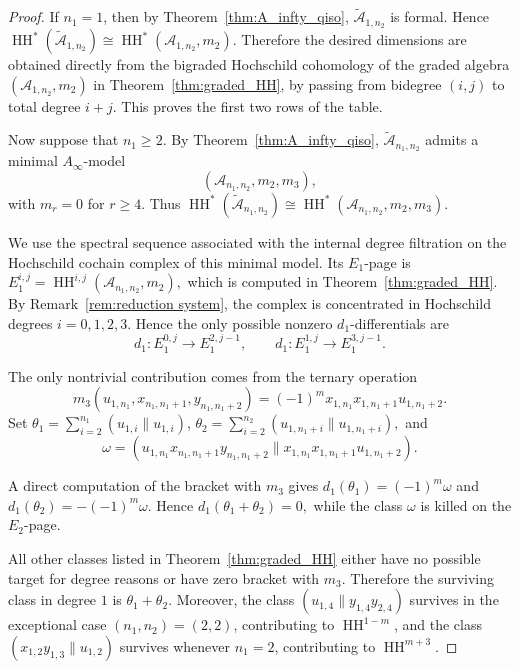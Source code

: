\documentclass[a4paper, reqno, 11pt]{amsart}
\theoremstyle{definition}
\begin{document}
\begin{proof}
	If \(n_1=1\), then by Theorem~\ref{thm:A_infty_qiso},
	\(\widetilde{\mathcal A}_{1,n_2}\) is formal. Hence
	\(
	\operatorname{HH}^\ast(\widetilde{\mathcal A}_{1,n_2})
	\cong
	\operatorname{HH}^\ast(\mathcal A_{1,n_2},m_2).
	\)
	Therefore the desired dimensions are obtained directly from the bigraded
	Hochschild cohomology of the graded algebra \((\mathcal A_{1,n_2},m_2)\) in
	Theorem~\ref{thm:graded_HH}, by passing from bidegree \((i,j)\) to total degree
	\(i+j\). This proves the first two rows of the table.
	
	Now suppose that \(n_1\ge 2\). By Theorem~\ref{thm:A_infty_qiso},
	\(\widetilde{\mathcal A}_{n_1,n_2}\) admits a minimal \(A_\infty\)-model \[(\mathcal A_{n_1,n_2},m_2,m_3),\] with \(
	m_r=0 \) for \(r\ge 4.\)
	Thus
	\(
	\operatorname{HH}^\ast(\widetilde{\mathcal A}_{n_1,n_2})
	\cong
	\operatorname{HH}^\ast(\mathcal A_{n_1,n_2},m_2,m_3).
	\)
	
	We use the spectral sequence associated with the internal degree filtration on
	the Hochschild cochain complex of this minimal model. Its \(E_1\)-page is
	\(
	E_1^{i,j}
	=
	\operatorname{HH}^{i,j}(\mathcal A_{n_1,n_2},m_2),
	\)
	which is computed in Theorem~\ref{thm:graded_HH}. By Remark~\ref{rem:reduction system},
	the complex is concentrated in Hochschild degrees \(i=0,1,2,3\). Hence the only
	possible nonzero \(d_1\)-differentials are
	\[
	d_1:E_1^{0,j}\longrightarrow E_1^{2,j-1},
	\qquad
	d_1:E_1^{1,j}\longrightarrow E_1^{3,j-1}.
	\]
	
	The only nontrivial contribution comes from the ternary operation
	\[
	m_3(u_{1,n_1},x_{n_1,n_1+1},y_{n_1,n_1+2})
	=
	(-1)^m x_{1,n_1}x_{1,n_1+1}u_{1,n_1+2}.
	\]
	Set
	\(
	\theta_1=
	\sum\limits_{i=2}^{n_1}(u_{1,i}\parallel u_{1,i})\), \(\theta_2=
	\sum\limits_{i=2}^{n_2}(u_{1,n_1+i}\parallel u_{1,n_1+i}),
	\)
	and
	\[
	\omega=
	(u_{1,n_1}x_{n_1,n_1+1}y_{n_1,n_1+2}
	\parallel
	x_{1,n_1}x_{1,n_1+1}u_{1,n_1+2}).
	\]
	
	A direct computation of the bracket with \(m_3\) gives \(d_1(\theta_1)=(-1)^m\omega\) and \(d_1(\theta_2)=-(-1)^m\omega.\) Hence \(d_1(\theta_1+\theta_2)=0,\) while the class \(\omega\) is killed on the \(E_2\)-page.
	
	All other classes listed in Theorem~\ref{thm:graded_HH} either have no possible
	target for degree reasons or have zero bracket with \(m_3\). Therefore the
	surviving class in degree \(1\) is \(\theta_1+\theta_2.\)
	Moreover, the class \((u_{1,4}\parallel y_{1,4}y_{2,4})\)
	survives in the exceptional case \((n_1,n_2)=(2,2)\), contributing to
	\(\operatorname{HH}^{1-m}\), and the class \((x_{1,2}y_{1,3}\parallel u_{1,2})\)
	survives whenever \(n_1=2\), contributing to \(\operatorname{HH}^{m+3}\).
	

\end{proof}
\end{document}
